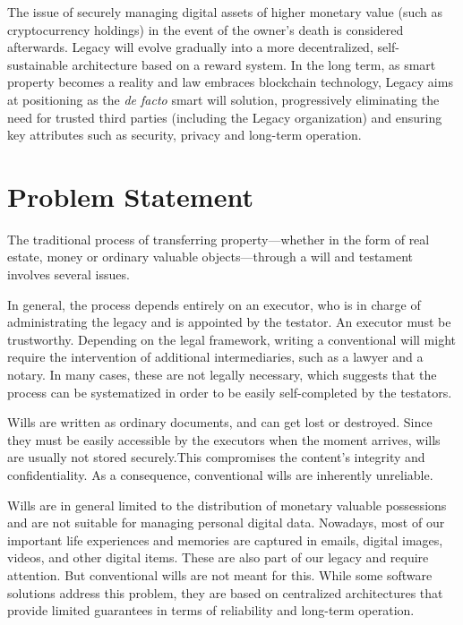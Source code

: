 The issue of securely managing digital assets of higher monetary value (such as cryptocurrency holdings) in the event of the owner's death is considered afterwards.
Legacy will evolve gradually into a more decentralized, self-sustainable architecture based on a reward system.
In the long term, as smart property becomes a reality and law embraces blockchain technology, Legacy aims at positioning as the \textit{de facto} smart will solution, progressively eliminating the need for trusted third parties (including the Legacy organization) and ensuring key attributes such as security, privacy and long-term operation.

\section{Problem Statement} %
\label{sec:problem_statement}

The traditional process of transferring property---whether in the form of real estate, money or ordinary valuable objects---through a will and testament involves several issues.

In general, the process depends entirely on an executor, who is in charge of administrating the legacy and is appointed by the testator. An executor must be trustworthy. Depending on the legal framework, writing a conventional will might require the intervention of additional intermediaries, such as a lawyer and a notary. In many cases, these are not legally necessary, which suggests that the process can be systematized in order to be easily self-completed by the testators. 

Wills are written as ordinary documents, and can get lost or destroyed. Since they must be easily accessible by the executors when the moment arrives, wills are usually not stored securely.This compromises the content's integrity and confidentiality. As a consequence, conventional wills are inherently unreliable.

Wills are in general limited to the distribution of monetary valuable possessions and are not suitable for managing personal digital data. Nowadays, most of our important life experiences and memories are captured in emails, digital images, videos, and other digital items. These are also part of our legacy and require attention. But conventional wills are not meant for this. While some software solutions address this problem, they are based on centralized architectures that provide limited guarantees in terms of reliability and long-term operation.

